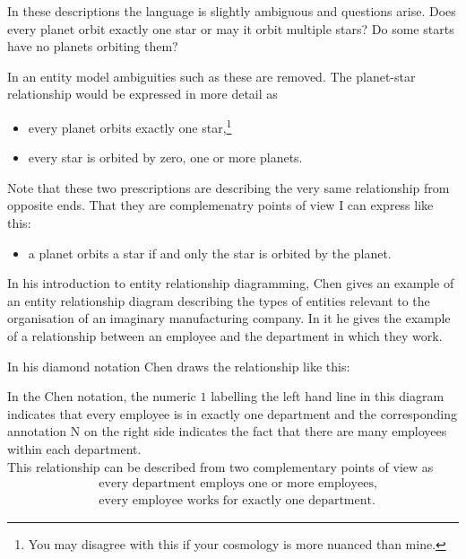 In these descriptions the language is slightly ambiguous and questions arise.
Does every planet orbit exactly one star or may it orbit multiple stars? Do some starts have no planets orbiting them?

In an entity model ambiguities such as these are removed. 
The planet-star relationship would be expressed in more detail as
\begin{itemize}
\item every planet orbits exactly one star,\footnote{You may disagree with this if your cosmology is more nuanced than mine.}
\item every star is orbited by zero, one or more planets.
\end{itemize}

Note that these two prescriptions are describing the very same relationship from opposite ends. That they are complemenatry points of view I can express like this:

\begin{itemize}
\item a planet orbits a star if and only the star is orbited by the planet.
\end{itemize}

\mynote
In his introduction to entity relationship diagramming, Chen gives an example of an entity relationship diagram describing the types of entities relevant to the organisation of an imaginary manufacturing company.
In it he gives the example of a relationship between an employee and the department in which they work. 

\noindent In his diamond notation Chen draws the relationship like this:
\begin{center}

\end{center}

\noindent In the Chen notation, the numeric $1$ labelling the left hand line in this diagram indicates that every employee is in exactly one department and the corresponding annotation N on the right side indicates the fact that there are many employees within each department. \\

\noindent This relationship can be described from  two complementary points of view as
\begin{align}
\label{employs}&\mbox{every department employs one or more employees,} \\
\label{worksfor}&\mbox{every employee works for exactly one department.}
\end{align}

